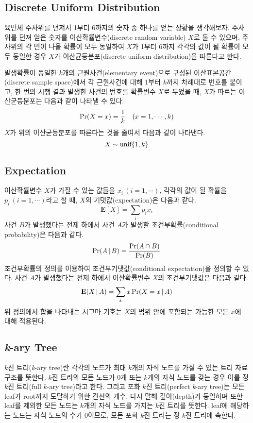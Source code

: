 \documentclass[11pt]{article}
\begin{document}
\subsection{Discrete Uniform Distribution}
육면체 주사위를 던져서 1부터 6까지의 숫자 중 하나를 얻는 상황을 생각해보자. 주사위를 던져 얻은 숫자를 이산확률변수(discrete random variable) $X$로 둘 수 있으며, 주사위의 각 면이 나올 확률이 모두 동일하여 $X$가 1부터 6까지 각각의 값이 될 확률이 모두 동일한 경우 $X$가 이산균등분포(discrete uniform distribution)을 따른다고 한다.

발생확률이 동일한 $k$개의 근원사건(elementary event)으로 구성된 이산표본공간(discrete sample space)에서 각 근원사건에 대해 1부터 $k$까지 차례대로 번호를 붙이고, 한 번의 시행 결과 발생한 사건의 번호를 확률변수 $X$로 두었을 때, $X$가 따르는 이산균등분포는 다음과 같이 나타낼 수 있다.
\[\textnormal{Pr}(X = x) = \frac{1}{k} \quad(x = 1,\cdots, k)\]
$X$가 위의 이산균등분포를 따른다는 것을 줄여서 다음과 같이 나타낸다.
\[X \sim \textnormal{unif}\{1, k\}\]

\subsection{Expectation}
이산확률변수 $X$가 가질 수 있는 값들을 $x_i \, (i = 1, \cdots)$, 각각의 값이 될 확률을 $p_i \, (i = 1, \cdots)$라고 할 때, $X$의 기댓값(expectation)은 다음과 같다.
\[\textbf{E}[X] = \sum_{i} p_{i} x_{i}\]
사건 $B$가 발생했다는 전제 하에서 사건 $A$가 발생할 조건부확률(conditional probability)은 다음과 같다.
\[\textnormal{Pr}(A\,|\,B) = \frac{\textnormal{Pr}(A \cap B)}{\textnormal{Pr}(B)}\]
조건부확률의 정의를 이용하여 조건부기댓값(conditional expectation)을 정의할 수 있다. 사건 $A$가 발생했다는 전제 하에서 이산확률변수 $X$의 조건부기댓값은 다음과 같다.
\[\textbf{E}(X\,|\,A) = \sum_{x} x\,\textnormal{Pr}(X = x\,|\,A)\]
위 정의에서 합을 나타내는 시그마 기호는 $X$의 범위 안에 포함되는 가능한 모든 $x$에 대해 적용된다.

\subsection{\textit{k}-ary Tree}
$k$진 트리(\textit{k}-ary tree)란 각각의 노드가 최대 $k$개의 자식 노드를 가질 수 있는 트리 자료구조를 뜻한다. $k$진 트리의 모든 노드가 0개 또는 $k$개의 자식 노드를 갖는 경우 이를 정 $k$진 트리(full $k$-ary tree)라고 한다. 그리고 포화 $k$진 트리(perfect \textit{k}-ary tree)는 모든 leaf가 root까지 도달하기 위한 간선의 개수, 다시 말해 깊이(depth)가 동일하며 또한 leaf를 제외한 모든 노드는 $k$개의 자식 노드를 가지는 $k$진 트리를 뜻한다. leaf에 해당하는 노드는 자식 노드의 수가 0이므로, 모든 포화 $k$진 트리는 정 $k$진 트리에 속한다.
\end{document}
